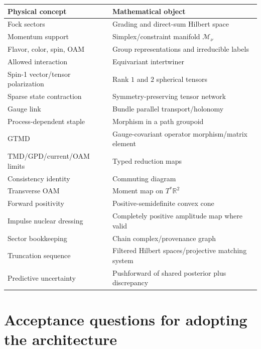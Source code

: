 \documentclass[11pt]{article}
\begin{document}
\begin{tabularx}{\textwidth}{L{0.29\textwidth}Y}
\toprule
Physical concept & Mathematical object\\
\midrule
Fock sectors & Grading and direct-sum Hilbert space\\
Momentum support & Simplex/constraint manifold \(\mathcal M_\nu\)\\
Flavor, color, spin, OAM & Group representations and irreducible labels\\
Allowed interaction & Equivariant intertwiner\\
Spin-1 vector/tensor polarization & Rank \(1\) and \(2\) spherical tensors\\
Sparse state contraction & Symmetry-preserving tensor network\\
Gauge link & Bundle parallel transport/holonomy\\
Process-dependent staple & Morphism in a path groupoid\\
GTMD & Gauge-covariant operator morphism/matrix element\\
TMD/GPD/current/OAM limits & Typed reduction maps\\
Consistency identity & Commuting diagram\\
Transverse OAM & Moment map on \(T^*\mathbb R^2\)\\
Forward positivity & Positive-semidefinite convex cone\\
Impulse nuclear dressing & Completely positive amplitude map where valid\\
Sector bookkeeping & Chain complex/provenance graph\\
Truncation sequence & Filtered Hilbert spaces/projective matching system\\
Predictive uncertainty & Pushforward of shared posterior plus discrepancy\\
\bottomrule
\end{tabularx}

\section{Acceptance questions for adopting the architecture}
\end{document}
